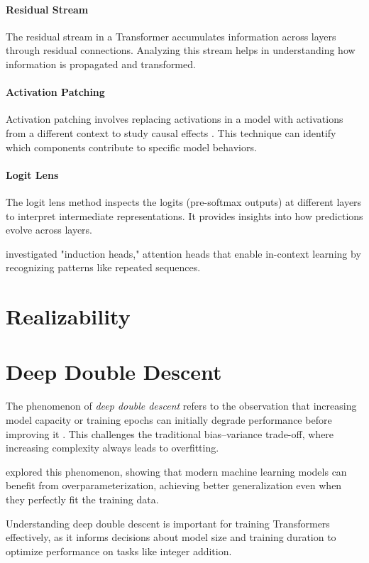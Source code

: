\paragraph{Residual Stream}

The residual stream in a Transformer accumulates information across layers through residual connections. Analyzing this stream helps in understanding how information is propagated and transformed.

\paragraph{Activation Patching}

Activation patching involves replacing activations in a model with activations from a different context to study causal effects \parencite{olsson_-context_2022}. This technique can identify which components contribute to specific model behaviors.

\paragraph{Logit Lens}

The logit lens method inspects the logits (pre-softmax outputs) at different layers to interpret intermediate representations. It provides insights into how predictions evolve across layers.

\textcite{olsson_-context_2022} investigated "induction heads," attention heads that enable in-context learning by recognizing patterns like repeated sequences.

\section{Realizability}\label{sec:realizability}


\section{Deep Double Descent}\label{sec:deep_double_descent}

The phenomenon of \emph{deep double descent} refers to the observation that increasing model capacity or training epochs can initially degrade performance before improving it \parencite{nakkiran_deep_2021}. This challenges the traditional bias–variance trade-off, where increasing complexity always leads to overfitting.

\textcite{belkin_reconciling_2019} explored this phenomenon, showing that modern machine learning models can benefit from overparameterization, achieving better generalization even when they perfectly fit the training data.

Understanding deep double descent is important for training Transformers effectively, as it informs decisions about model size and training duration to optimize performance on tasks like integer addition.

